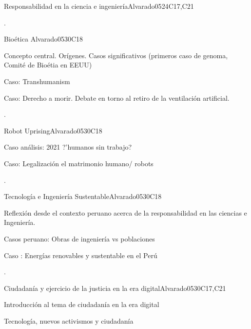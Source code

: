 \begin{syllabus}
\begin{unit}{Responsabilidad en la ciencia e ingeniería}{}{Alvarado05}{24}{C17,C21}
   \begin{learningoutcomes}
      \item .  
   \end{learningoutcomes}
\end{unit}
\begin{unit}{Bioética }{}{Alvarado05}{30}{C18}
   \begin{topics}
      \item  Concepto central. Orígenes. Casos significativos (primeros caso de genoma, Comité de Bioétia en EEUU)
      \item  Caso: Transhumanism
      \item  Caso: Derecho a morir. Debate en torno al retiro de la ventilación artificial.
   \end{topics} 
   \begin{learningoutcomes}
      \item . 
   \end{learningoutcomes}
\end{unit}
\begin{unit}{Robot Uprising}{}{Alvarado05}{30}{C18}
   \begin{topics}
      \item  Caso análisis: 2021 ?'humanos sin trabajo? 
      \item  Caso: Legalización el matrimonio humano/ robots 
   \end{topics}

   \begin{learningoutcomes}
      \item .
   \end{learningoutcomes}
\end{unit}
\begin{unit}{ Tecnología e Ingeniería Sustentable}{}{Alvarado05}{30}{C18}
   \begin{topics}
      \item Reflexión desde el contexto peruano acerca de la responsabilidad en las ciencias e Ingeniería. 
      \item Casos peruano: Obras de ingeniería vs poblaciones
      \item Caso : Energías renovables y sustentable en el Perú 
   \end{topics}
   \begin{learningoutcomes}
      \item . 
   \end{learningoutcomes}
\end{unit}
\begin{unit}{ Ciudadanía y ejercicio de la justicia en la era digital}{}{Alvarado05}{30}{C17,C21}
   \begin{topics}
      \item Introducción al tema de ciudadanía en la era digital
      \item Tecnología,  nuevos activismos y ciudadanía
   \end{topics}


\end{unit}
\end{syllabus}
